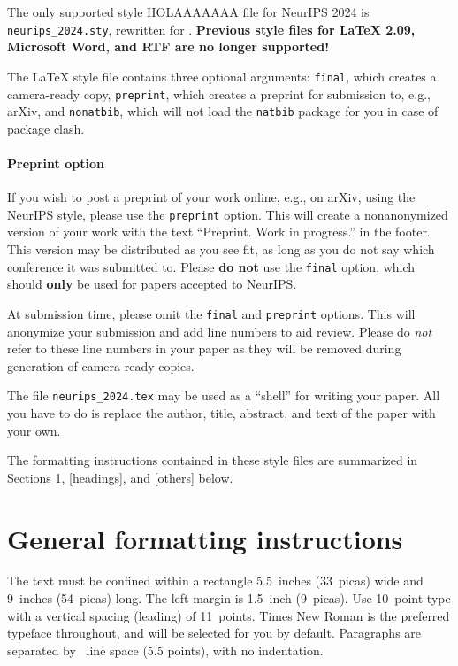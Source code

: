 \documentclass{article}
\begin{document}
The only supported style HOLAAAAAAA file for NeurIPS 2024 is \verb+neurips_2024.sty+,
rewritten for \LaTeXe{}.  \textbf{Previous style files for \LaTeX{} 2.09,
  Microsoft Word, and RTF are no longer supported!}


The \LaTeX{} style file contains three optional arguments: \verb+final+, which
creates a camera-ready copy, \verb+preprint+, which creates a preprint for
submission to, e.g., arXiv, and \verb+nonatbib+, which will not load the
\verb+natbib+ package for you in case of package clash.


\paragraph{Preprint option}
If you wish to post a preprint of your work online, e.g., on arXiv, using the
NeurIPS style, please use the \verb+preprint+ option. This will create a
nonanonymized version of your work with the text ``Preprint. Work in progress.''
in the footer. This version may be distributed as you see fit, as long as you do not say which conference it was submitted to. Please \textbf{do
  not} use the \verb+final+ option, which should \textbf{only} be used for
papers accepted to NeurIPS.


At submission time, please omit the \verb+final+ and \verb+preprint+
options. This will anonymize your submission and add line numbers to aid
review. Please do \emph{not} refer to these line numbers in your paper as they
will be removed during generation of camera-ready copies.


The file \verb+neurips_2024.tex+ may be used as a ``shell'' for writing your
paper. All you have to do is replace the author, title, abstract, and text of
the paper with your own.


The formatting instructions contained in these style files are summarized in
Sections \ref{gen_inst}, \ref{headings}, and \ref{others} below.


\section{General formatting instructions}
\label{gen_inst}


The text must be confined within a rectangle 5.5~inches (33~picas) wide and
9~inches (54~picas) long. The left margin is 1.5~inch (9~picas).  Use 10~point
type with a vertical spacing (leading) of 11~points.  Times New Roman is the
preferred typeface throughout, and will be selected for you by default.
Paragraphs are separated by ~line space (5.5 points), with no
indentation.
\end{document}
